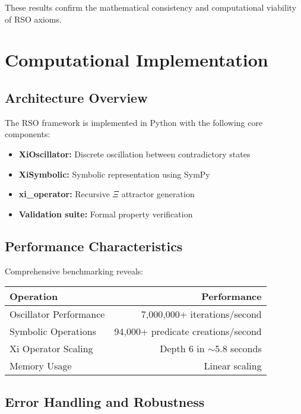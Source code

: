 \documentclass[11pt,a4paper]{article}
\begin{document}
These results confirm the mathematical consistency and computational viability of RSO axioms.

\section{Computational Implementation}

\subsection{Architecture Overview}

The RSO framework is implemented in Python with the following core components:

\begin{itemize}
    \item \textbf{XiOscillator:} Discrete oscillation between contradictory states
    \item \textbf{XiSymbolic:} Symbolic representation using SymPy
    \item \textbf{xi\_operator:} Recursive $\Xi$ attractor generation
    \item \textbf{Validation suite:} Formal property verification
\end{itemize}

\subsection{Performance Characteristics}

Comprehensive benchmarking reveals:

\begin{center}
\begin{tabular}{lr}
\toprule
\textbf{Operation} & \textbf{Performance} \\
\midrule
Oscillator Performance & 7,000,000+ iterations/second \\
Symbolic Operations & 94,000+ predicate creations/second \\
Xi Operator Scaling & Depth 6 in $\sim$5.8 seconds \\
Memory Usage & Linear scaling \\
\bottomrule
\end{tabular}
\end{center}

\subsection{Error Handling and Robustness}
\end{document}
